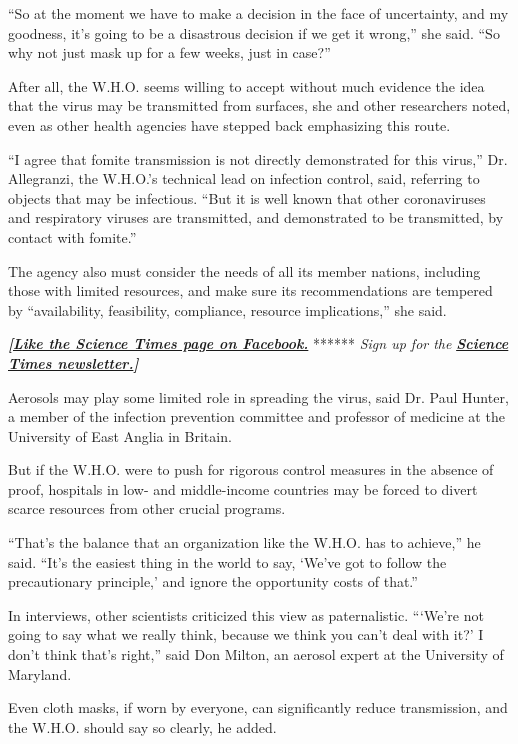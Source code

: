 ``So at the moment we have to make a decision in the face of
uncertainty, and my goodness, it's going to be a disastrous decision if
we get it wrong,'' she said. ``So why not just mask up for a few weeks,
just in case?''

After all, the W.H.O. seems willing to accept without much evidence the
idea that the virus may be transmitted from surfaces, she and other
researchers noted, even as other health agencies have stepped back
emphasizing this route.

``I agree that fomite transmission is not directly demonstrated for this
virus,'' Dr. Allegranzi, the W.H.O.'s technical lead on infection
control, said, referring to objects that may be infectious. ``But it is
well known that other coronaviruses and respiratory viruses are
transmitted, and demonstrated to be transmitted, by contact with
fomite.''

The agency also must consider the needs of all its member nations,
including those with limited resources, and make sure its
recommendations are tempered by ``availability, feasibility, compliance,
resource implications,'' she said.

\textbf{\emph{{[}}\href{http://on.fb.me/1paTQ1h}{\emph{Like the Science
Times page on Facebook.}}} ****** \emph{\textbar{} Sign up for the}
\textbf{\href{http://nyti.ms/1MbHaRU}{\emph{Science Times
newsletter.}}\emph{{]}}}

Aerosols may play some limited role in spreading the virus, said Dr.
Paul Hunter, a member of the infection prevention committee and
professor of medicine at the University of East Anglia in Britain.

But if the W.H.O. were to push for rigorous control measures in the
absence of proof, hospitals in low- and middle-income countries may be
forced to divert scarce resources from other crucial programs.

``That's the balance that an organization like the W.H.O. has to
achieve,'' he said. ``It's the easiest thing in the world to say, `We've
got to follow the precautionary principle,' and ignore the opportunity
costs of that.''

In interviews, other scientists criticized this view as paternalistic.
```We're not going to say what we really think, because we think you
can't deal with it?' I don't think that's right,'' said Don Milton, an
aerosol expert at the University of Maryland.

Even cloth masks, if worn by everyone, can significantly reduce
transmission, and the W.H.O. should say so clearly, he added.

